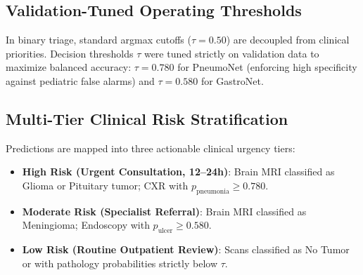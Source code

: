 \documentclass[conference]{IEEEtran}
\begin{document}
\subsection{Validation-Tuned Operating Thresholds}
In binary triage, standard argmax cutoffs ($\tau=0.50$) are decoupled from clinical priorities. Decision thresholds $\tau$ were tuned strictly on validation data to maximize balanced accuracy: $\tau=0.780$ for PneumoNet (enforcing high specificity against pediatric false alarms) and $\tau=0.580$ for GastroNet.

\subsection{Multi-Tier Clinical Risk Stratification}
Predictions are mapped into three actionable clinical urgency tiers:
\begin{itemize}
    \item \textbf{High Risk (Urgent Consultation, 12--24h)}: Brain MRI classified as Glioma or Pituitary tumor; CXR with $p_{\text{pneumonia}} \ge 0.780$.
    \item \textbf{Moderate Risk (Specialist Referral)}: Brain MRI classified as Meningioma; Endoscopy with $p_{\text{ulcer}} \ge 0.580$.
    \item \textbf{Low Risk (Routine Outpatient Review)}: Scans classified as No Tumor or with pathology probabilities strictly below $\tau$.
\end{itemize}
\end{document}
